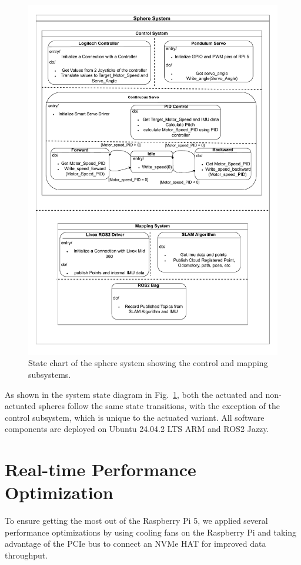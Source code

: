 \documentclass[english, bachelor, utf8]{base/thesis_telematics}
\begin{document}
\begin{figure}
    \centering
    \includegraphics[width=0.95\linewidth]{pics/Khonsu_vertical.pdf} 
    \caption{State chart of the sphere system showing the control and mapping subsystems.}
    \label{fig:sphere_system}
\end{figure}

As shown in the system state diagram in Fig.~\ref{fig:sphere_system}, both the actuated and non-actuated spheres follow the same state transitions, with the exception of the control subsystem, which is unique to the actuated variant. 
All software components are deployed on Ubuntu 24.04.2 LTS ARM and ROS2 Jazzy.

\section{Real-time Performance Optimization}
To ensure getting the most out of the Raspberry Pi 5, we applied several performance optimizations by using cooling fans on the Raspberry Pi and taking advantage of the PCIe bus to connect an NVMe HAT for improved data throughput.
\end{document}
